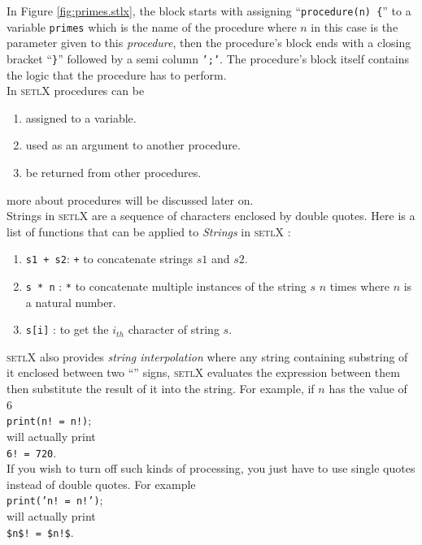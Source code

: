 \documentclass[11pt]{report}
\begin{document}
In Figure \ref{fig:primes.stlx}, the block starts with assigning ``\texttt{procedure(n) \{}'' to a variable \texttt{primes} which is the name of the procedure where $n$ in this case is the parameter given to this \textsl{procedure}, then the procedure's block ends with a closing bracket ``\texttt{\}}'' followed by a semi column \texttt{';'}. The procedure's block itself contains the logic that the procedure has to perform.\\
In \textsc{setlX} procedures can be
\begin{enumerate}
\item assigned to a variable.
\item used as an argument to another procedure.
\item be returned from other procedures.
\end{enumerate}
more about procedures will be discussed later on.
\\

Strings in \textsc{setlX} are a sequence of characters enclosed by double quotes. Here is a list of functions that can be applied to \textsl{Strings} in \textsc{setlX} :
\begin{enumerate}
\item \texttt{s1 + s2}: \texttt{+} to concatenate strings $s1$ and $s2$.
\item \texttt{s * n} : \texttt{*} to concatenate multiple instances of the string $s$ $n$ times where $n$ is a natural number.
\item \texttt{s[i]} : to get the $i_{th}$ character of string $s$.
\end{enumerate}
\textsc{setlX} also provides \textsl{string interpolation} where any string containing substring of it enclosed between two ``\texttt{}'' signs, \textsc{setlX} evaluates the expression between them then substitute the result of it into the string. For example, if $n$ has the value of $6$
\\[0.2cm]
\hspace*{1.3cm}
\texttt{print(n! = n!)};
\\[0.2cm]
will actually print
\\[0.2cm]
\hspace*{1.3cm}
\texttt{6! = 720}.
\\[0.2cm]
If you wish to turn off such kinds of processing, you just have to use single quotes instead of double quotes. For example
\\[0.2cm]
\hspace*{1.3cm}
\texttt{print('n! = n!')};
\\[0.2cm]
will actually print
\\[0.2cm]
\hspace*{1.3cm}
\texttt{\$n\$! = \$n!\$}.
\\[0.2cm]
\\
\end{document}
